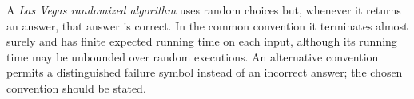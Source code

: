 
A \emph{Las Vegas randomized algorithm} uses random choices but, whenever it returns an answer, that answer is correct. In the common convention it terminates almost surely and has finite expected running time on each input, although its running time may be unbounded over random executions. An alternative convention permits a distinguished failure symbol instead of an incorrect answer; the chosen convention should be stated.
